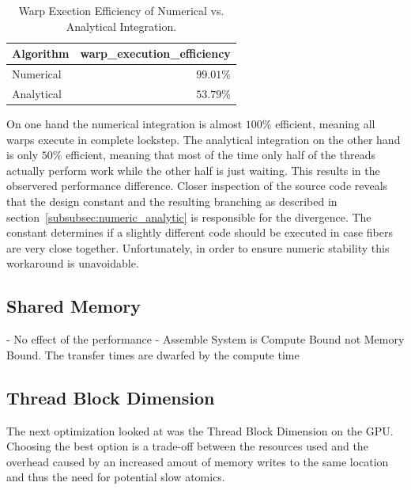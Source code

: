 \documentclass[a4paper,11pt]{kth-mag}
\begin{document}
\begin{table}[h]
\begin{center}
  \begin{tabulary}{0.7\textwidth}{LR}
    \toprule
    Algorithm & warp\_execution\_efficiency \\
    \midrule
    Numerical & $99.01\%$ \\
    Analytical & $53.79\%$ \\
    \bottomrule
  \end{tabulary}
\end{center}
\caption{Warp Exection Efficiency of Numerical vs. Analytical Integration.}
\label{tab:branch_divergence}
\end{table}

On one hand the numerical integration is almost $100\%$ efficient, meaning all warps execute in complete lockstep. The analytical integration on the other hand is only $50\%$ efficient, meaning that most of the time only half of the threads actually perform work while the other half is just waiting. This results in the observered performance difference. Closer inspection of the source code reveals that the design constant and the resulting branching as described in section~\ref{subsubsec:numeric_analytic} is responsible for the divergence. The constant determines if a slightly different code should be executed in case fibers are very close together. Unfortunately, in order to ensure numeric stability this workaround is unavoidable.

\subsection{Shared Memory}

- No effect of the performance
- Assemble System is Compute Bound not Memory Bound. The transfer times are dwarfed by the compute time

\subsection{Thread Block Dimension}

The next optimization looked at was the Thread Block Dimension on the GPU. Choosing the best option is a trade-off between the resources used and the overhead caused by an increased amout of memory writes to the same location and thus the need for potential slow atomics.
\end{document}
